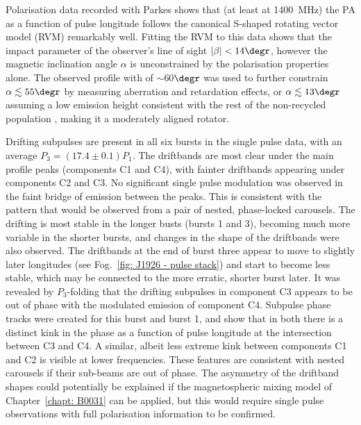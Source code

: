 Polarisation data recorded with Parkes shows that (at least at 1400~MHz) the PA as a function of pulse longitude follows the canonical S-shaped rotating vector model (RVM) remarkably well. Fitting the RVM to this data shows that the impact parameter of the observer's line of sight $|\beta| < 14\degr$, however the magnetic inclination angle $\alpha$ is unconstrained by the polarisation properties alone. The observed profile with of $\sim$60$\degr$ was used to further constrain $\alpha \lesssim 55\degr$ by measuring aberration and retardation effects, or $\alpha \lesssim 13\degr$ assuming a low emission height consistent with the rest of the non-recycled population \citep{JKxx2019}, making it a moderately aligned rotator.

Drifting subpulses are present in all six bursts in the single pulse data, with an average $P_3 = (17.4\pm 0.1) P_1$. The driftbands are most clear under the main profile peaks (components C1 and C4), with fainter driftbands appearing under components C2 and C3. No significant single pulse modulation was observed in the faint bridge of emission between the peaks. This is consistent with the pattern that would be observed from a pair of nested, phase-locked carousels. The drifting is most stable in the longer busts (bursts 1 and 3), becoming much more variable in the shorter bursts, and changes in the shape of the driftbands were also observed. 
The driftbands at the end of burst three appear to move to slightly later longitudes (see Fog.~\ref{fig: J1926 - pulse stack}) and start to become less stable, which may be connected to the more erratic, shorter burst later.
It was revealed by $P_3$-folding that the drifting subpulses in component C3 appears to be out of phase with the modulated emission of component C4. Subpulse phase tracks were created for this burst and burst 1, and show that in both there is a distinct kink in the phase as a function of pulse longitude at the intersection between C3 and C4. A similar, albeit less extreme kink between components C1 and C2 is visible at lower frequencies. These features are consistent with nested carousels if their sub-beams are out of phase. The asymmetry of the driftband shapes could potentially be explained if the magnetospheric mixing model of Chapter~\ref{chapt: B0031} can be applied, but this would require single pulse observations with full polarisation information to be confirmed.

